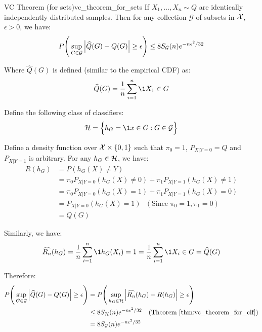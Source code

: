 \begin{theorem}{VC Theorem (for sets)}{vc_theorem_for_sets}
    If $X_1, \dots, X_n\sim Q$ are identically independently distributed samples. Then for any collection $\mathcal{G}$ of subsets in $\mathcal{X}$, $\epsilon>0$, we have:
    \begin{align*}
        P\Bigg( 
            \sup_{G\in\mathcal{G}} \Big| 
                \widehat{Q}(G) - Q(G) 
             \Big|\ge \epsilon
         \Bigg) \le 8S_\mathcal{G}(n)e^{-n\epsilon^2/32}
    \end{align*}

    \noindent Where $\widehat{Q}(G)$ is defined (similar to the empirical CDF) as:
    \begin{align*}
        \widehat{Q}(G) = \frac{1}{n}\sum_{i=1}^n \1{X_1\in G}
    \end{align*}
\end{theorem}

\begin{proof*}
    Define the following class of classifiers:
    \begin{align*}
        \Hf = \bigCurl{
            h_G = \1{x\in G} : G \in \mathcal{G}
        }
    \end{align*}

    \noindent Define a density function over $\mathcal{X}\times\{0,1\}$ such that $\pi_0=1$, $P_{X|Y=0}=Q$ and $P_{X|Y=1}$ is arbitrary. For any $h_G\in \mathcal{H}$, we have:
    \begin{align*}
        R(h_G) &= P(h_G(X) \ne Y) \\
        &= \pi_0P_{X|Y=0}(h_G(X) \ne 0) + \pi_1 P_{X|Y=1}(h_G(X) \ne 1) \\
        &= \pi_0P_{X|Y=0}(h_G(X) = 1) + \pi_1 P_{X|Y=1}(h_G(X) = 0) \\
        &= P_{X|Y=0}(h_G(X) = 1) \ \ \ (\text{Since } \pi_0=1, \pi_1=0)\\
        &= Q(G)
    \end{align*}

    \noindent Similarly, we have:
    \begin{align*}
        \widehat{R_n}(h_G) = \frac{1}{n}\sum_{i=1}^n \1{h_G(X_i) = 1} = \frac{1}{n}\sum_{i=1}^n \1{X_i\in G} = \widehat{Q}(G)
    \end{align*}

    \noindent Therefore:
    \begin{align*}
        P\Bigg( 
            \sup_{G\in\mathcal{G}} \Big| 
                \widehat{Q}(G) - Q(G) 
             \Big|\ge \epsilon
         \Bigg)
        &= 
        P\Bigg( 
            \sup_{h_G\in\mathcal{H}} \Big| 
                \widehat{R_n}(h_G) - R(h_G) 
             \Big|\ge \epsilon
         \Bigg) \\
        &\le 8S_{\mathcal{H}}(n)e^{-n\epsilon^2/32} \ \ \ (\text{Theorem }\ref{thm:vc_theorem_for_clf}) \\
        &= 8S_\mathcal{G}(n)e^{-n\epsilon^2/32}
    \end{align*}
\end{proof*}


